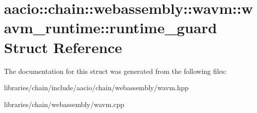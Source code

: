 \hypertarget{structaacio_1_1chain_1_1webassembly_1_1wavm_1_1wavm__runtime_1_1runtime__guard}{}\section{aacio\+:\+:chain\+:\+:webassembly\+:\+:wavm\+:\+:wavm\+\_\+runtime\+:\+:runtime\+\_\+guard Struct Reference}
\label{structaacio_1_1chain_1_1webassembly_1_1wavm_1_1wavm__runtime_1_1runtime__guard}


The documentation for this struct was generated from the following files\+:\begin{DoxyCompactItemize}
\item 
libraries/chain/include/aacio/chain/webassembly/wavm.\+hpp\item 
libraries/chain/webassembly/wavm.\+cpp\end{DoxyCompactItemize}
